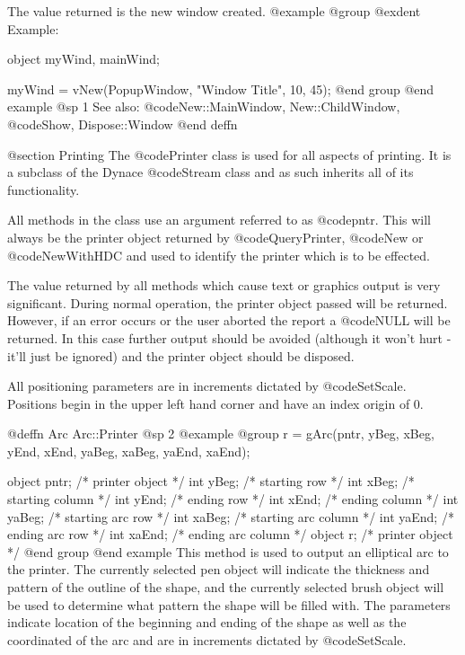 The value returned is the new window created.
@example
@group
@exdent Example:

object  myWind, mainWind;

myWind = vNew(PopupWindow, "Window Title", 10, 45);
@end group
@end example
@sp 1
See also:  @code{New::MainWindow, New::ChildWindow,}
      @code{Show, Dispose::Window}
@end deffn




@section Printing
The @code{Printer} class is used for all aspects of printing.
It is a subclass of the Dynace @code{Stream} class and as
such inherits all of its functionality.

All methods in the class use an argument referred to as @code{pntr}.
This will always be the printer object returned by @code{QueryPrinter},
@code{New} or @code{NewWithHDC} and used to identify the printer
which is to be effected.

The value returned by all methods which cause text or graphics output is
very significant.  During normal operation, the printer object passed
will be returned.  However, if an error occurs or the user aborted the
report a @code{NULL} will be returned.  In this case further output
should be avoided (although it won't hurt - it'll just be ignored) and
the printer object should be disposed.

All positioning parameters are in increments dictated by
@code{SetScale}.  Positions begin in the upper left hand corner and have
an index origin of 0.



















@deffn {Arc} Arc::Printer
@sp 2
@example
@group
r = gArc(pntr, yBeg, xBeg, yEnd, xEnd, yaBeg, xaBeg, yaEnd, xaEnd);

object  pntr;   /*  printer object         */
int     yBeg;   /*  starting row           */
int     xBeg;   /*  starting column        */
int     yEnd;   /*  ending row             */
int     xEnd;   /*  ending column          */
int     yaBeg;  /*  starting arc row       */
int     xaBeg;  /*  starting arc column    */
int     yaEnd;  /*  ending arc row         */
int     xaEnd;  /*  ending arc column      */
object  r;      /*  printer object         */
@end group
@end example
This method is used to output an elliptical arc to the printer.  The
currently selected pen object will indicate the thickness and pattern of
the outline of the shape, and the currently selected brush object will
be used to determine what pattern the shape will be filled with.  The
parameters indicate location of the beginning and ending of the shape as
well as the coordinated of the arc and are in increments dictated by
@code{SetScale}.

